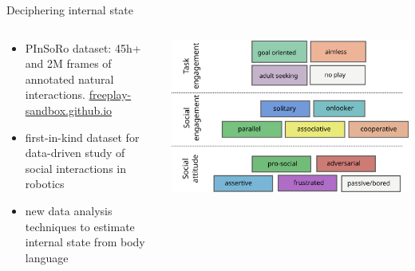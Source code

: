 \documentclass[xcolor=table]{beamer}
\begin{document}
{\begin{frame}{Deciphering internal state}
\begin{columns}
\begin{column}{0.5\linewidth}
        \end{column}
    \end{columns}
\begin{columns}
    \begin{column}{0.5\linewidth}
        {\scriptsize
        \begin{itemize}
            \item PInSoRo dataset: 45h+ and 2M frames of annotated natural
                interactions. \url{freeplay-sandbox.github.io}
            \item first-in-kind dataset for data-driven study of social
                interactions in robotics
            \item new data analysis techniques to estimate internal state from body language
        \end{itemize}
        }
    \end{column}
    \begin{column}{0.5\linewidth}
            \includegraphics[width=\columnwidth]{pinsoro/coding-scheme}
    \end{column}
\end{columns}

\end{frame}
}



\end{document}
